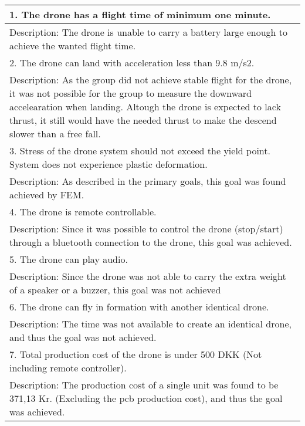 \begin{center}
  \begin{tabular}{| m{33em} |}
      \hline
      \color{BrickRed}
      1. The drone has a flight time of minimum one minute.  \\ 
      \hline
      Description:  The drone is unable to carry a battery large enough to achieve the wanted flight time. \\ 
      \hline
      \hline
      \color{YellowOrange}
      2. The drone can land with acceleration less than 9.8 
      m/s2. \\ 
      \hline
      Description:   As the group did not achieve stable flight for the drone, it was not possible for the group to measure the downward accelearation when landing. 
      Altough the drone is expected to lack thrust, it still would have the needed thrust to make the descend slower than a free fall.\\ 
      \hline
      \hline
      \color{ForestGreen}
      3. Stress of the drone system should not exceed the 
      yield point. System does not experience plastic 
      deformation. \\
      \hline
      Description:  As described in the primary goals, this goal was found achieved by FEM. \\ 
      \hline
      \hline
      \color{ForestGreen}
      4. The drone is remote controllable. \\
      \hline
      Description:  Since it was possible to control the drone (stop/start) through a bluetooth connection to the drone, this goal was achieved. \\ 
      \hline
      \hline
      \color{BrickRed}
      5. The drone can play audio.\\
      \hline
      Description:   Since the drone was not able to carry the extra weight of a speaker or a buzzer, this goal was not achieved\\ 
      \hline
      \hline
      \color{BrickRed}
      6. The drone can fly in formation with another 
      identical drone. \\
      \hline
      Description:  The time was not available to create an identical drone, and thus the goal was not achieved. \\ 
      \hline
      \hline
      \color{ForestGreen}
      7. Total production cost of the drone is under 500 DKK 
      (Not including remote controller). \\
      \hline
      Description: The production cost of a single unit was found to be 371,13 Kr. (Excluding the pcb production cost), and thus the goal was achieved. \\ 
      \hline
  \end{tabular}


\end{center}
